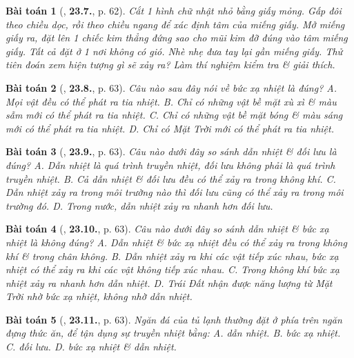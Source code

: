 \documentclass{article}
\numberwithin{equation}{section}
\newtheorem{baitoan}{Bài toán}
\begin{document}
\begin{baitoan}[\cite{SBT_Vat_Ly_8}, \textbf{23.7.}, p. 62]
	Cắt 1 hình chữ nhật nhỏ bằng giấy mỏng. Gấp đôi theo chiều dọc, rồi theo chiều ngang để xác định tâm của miếng giấy. Mở miếng giấy ra, đặt lên 1 chiếc kim thẳng đứng sao cho mũi kim đỡ đúng vào tâm miếng giấy. Tất cả đặt ở 1 nơi không có gió. Nhè nhẹ đưa tay lại gần miếng giấy. Thử tiên đoán xem hiện tượng gì sẽ xảy ra? Làm thí nghiệm kiểm tra \& giải thích.
\end{baitoan}

\begin{baitoan}[\cite{SBT_Vat_Ly_8}, \textbf{23.8.}, p. 63]
	Câu nào sau đây nói về bức xạ nhiệt là đúng? {\sf A.} Mọi vật đều có thể phát ra tia nhiệt. {\sf B.} Chỉ có những vật bề mặt xù xì \& màu sẫm mới có thể phát ra tia nhiệt. {\sf C.} Chỉ có những vật bề mặt bóng \& màu sáng mới có thể phát ra tia nhiệt. {\sf D.} Chỉ có Mặt Trời mới có thể phát ra tia nhiệt.
\end{baitoan}

\begin{baitoan}[\cite{SBT_Vat_Ly_8}, \textbf{23.9.}, p. 63]
	Câu nào dưới đây so sánh dẫn nhiệt \& đối lưu là đúng? {\sf A.} Dẫn nhiệt là quá trình truyền nhiệt, đối lưu không phải là quá trình truyền nhiệt. {\sf B.} Cả dẫn nhiệt \& đối lưu đều có thể xảy ra trong không khí. {\sf C.} Dẫn nhiệt xảy ra trong môi trường nào thì đối lưu cũng có thể xảy ra trong môi trường đó. {\sf D.} Trong nước, dẫn nhiệt xảy ra nhanh hơn đối lưu.
\end{baitoan}

\begin{baitoan}[\cite{SBT_Vat_Ly_8}, \textbf{23.10.}, p. 63]
	Câu nào dưới đây so sánh dẫn nhiệt \& bức xạ nhiệt là không đúng? {\sf A.} Dẫn nhiệt \& bức xạ nhiệt đều có thể xảy ra trong không khí \& trong chân không. {\sf B.} Dẫn nhiệt xảy ra khi các vật tiếp xúc nhau, bức xạ nhiệt có thể xảy ra khi các vật không tiếp xúc nhau. {\sf C.} Trong không khí bức xạ nhiệt xảy ra nhanh hơn dẫn nhiệt. {\sf D.} Trái Đất nhận được năng lượng từ Mặt Trời nhờ bức xạ nhiệt, không nhờ dẫn nhiệt.
\end{baitoan}

\begin{baitoan}[\cite{SBT_Vat_Ly_8}, \textbf{23.11.}, p. 63]
	Ngăn đá của tủ lạnh thường đặt ở phía trên ngăn đựng thức ăn, để tận dụng sự truyền nhiệt bằng: {\sf A.} dẫn nhiệt. {\sf B.} bức xạ nhiệt. {\sf C.} đối lưu. {\sf D.} bức xạ nhiệt \& dẫn nhiệt.
\end{baitoan}
\end{document}
